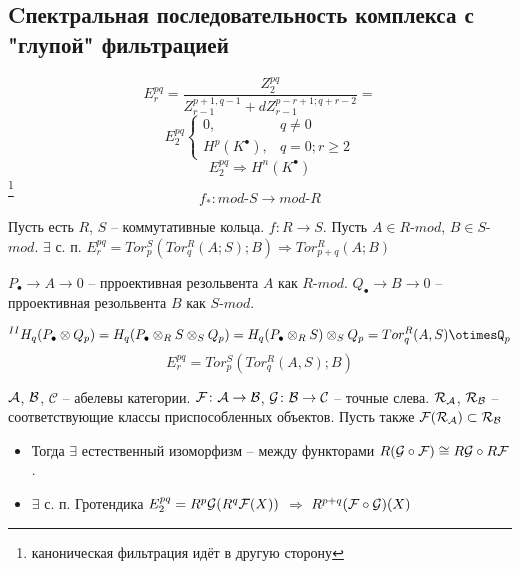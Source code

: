 \documentclass[../main.tex]{subfiles}
\begin{document}
\subsection{Cпектральная последовательность комплекса с "глупой" фильтрацией}
\[
E_r^{pq} = \dfrac{Z_2^{pq}}{Z_{r-1}^{p+1, q-1} + dZ_{r-1}^{p-r+1;q+r-2}} =
\]
\[E_2^{pq}\begin{cases} 0, &q\neq 0 \\ H^p(K^\bullet), &q=0; r\ge 2
\end{cases}
\]
\[
E_2^{pq} \Rightarrow H^n(K^\bullet)
\]\footnote{каноническая фильтрация идёт в другую сторону}
\[
f_{*}: mod\text{-}S \to mod\text{-}R
\]
\begin{to_ex}
Пусть есть $R$, $S$ -- коммутативные кольца. $f\colon R \to S$. Пусть $A\in R$-$mod$, $B\in S$-$mod$. $\exists$ с. п. $E_r^{pq}=Tor_p^S(Tor_q^R(A; S); B) \Rightarrow Tor_{p+q}^R(A; B)$
\end{to_ex}
$P_\bullet\to A\to 0$ -- прроективная резольвента $A$ как $R$-$mod$. $Q_\bullet\to B\to 0$ -- прроективная резольвента $B$ как $S$-$mod$.
\bee\label{tens}
\eee
\[
^{II}H_q(P_\bullet\otimes Q_p) = H_q(P_\bullet \otimes_R S \otimes_S Q_p) = H_q(P_\bullet \otimes_R S)\otimes_S Q_p = Tor_q^R(A, S)\otimesQ_p
\]
\[
E_r^{pq} = Tor_p^S (Tor_q^R(A, S); B)
\]
\begin{to_thr}[Гротендик]
$\mathcal{A}$, $\mathcal{B}$, $\mathcal{C}$ -- абелевы категории. $\mathcal{F} \colon \mathcal{A} \to \mathcal{B}$, $\mathcal{G}\colon \mathcal{B} \to \mathcal{C}$ -- точные слева. $\mathcal{R}_{\mathcal{A}}$, $\mathcal{R}_{\mathcal{B}}$ -- соответствующие классы приспособленных объектов. Пусть также $\mathcal{F}(\mathcal{R}_{\mathcal{A}}) \subset \mathcal{R}_{\mathcal{B}}$
\begin{itemize}
    \item Тогда $\exists$ естественный изоморфизм -- между функторами $R(\mathcal{G}\circ \mathcal{F})\cong R\mathcal{G}\circ R\mathcal{F}$.
    \item $\exists$ с. п. Гротендика $E_2^{pq} = R^p \mathcal{G} (R^q\mathcal{F}(X))$ $\Rightarrow$ $R^{p+q}(\mathcal{F} \circ \mathcal{G})(X)$
\end{itemize}
\end{to_thr}
\end{document}
